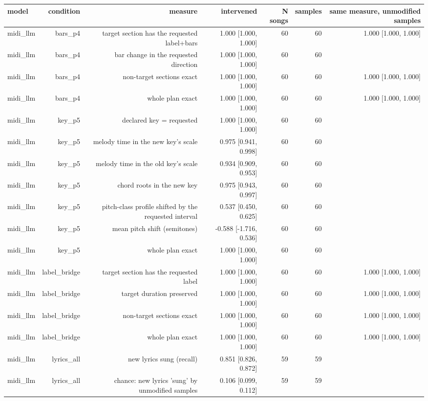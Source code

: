 \begin{table}[t]
\centering
\small
\begin{tabular}{lrrrrrr}
\toprule
model & condition & measure & intervened & N songs & samples & same measure, unmodified samples \\
\midrule
midi\_llm & bars\_p4 & target section has the requested label+bars & 1.000 [1.000, 1.000] & 60 & 60 & 1.000 [1.000, 1.000] \\
midi\_llm & bars\_p4 & bar change in the requested direction & 1.000 [1.000, 1.000] & 60 & 60 &  \\
midi\_llm & bars\_p4 & non-target sections exact & 1.000 [1.000, 1.000] & 60 & 60 & 1.000 [1.000, 1.000] \\
midi\_llm & bars\_p4 & whole plan exact & 1.000 [1.000, 1.000] & 60 & 60 & 1.000 [1.000, 1.000] \\
midi\_llm & key\_p5 & declared key = requested & 1.000 [1.000, 1.000] & 60 & 60 &  \\
midi\_llm & key\_p5 & melody time in the new key's scale & 0.975 [0.941, 0.998] & 60 & 60 &  \\
midi\_llm & key\_p5 & melody time in the old key's scale & 0.934 [0.909, 0.953] & 60 & 60 &  \\
midi\_llm & key\_p5 & chord roots in the new key & 0.975 [0.943, 0.997] & 60 & 60 &  \\
midi\_llm & key\_p5 & pitch-class profile shifted by the requested interval & 0.537 [0.450, 0.625] & 60 & 60 &  \\
midi\_llm & key\_p5 & mean pitch shift (semitones) & -0.588 [-1.716, 0.536] & 60 & 60 &  \\
midi\_llm & key\_p5 & whole plan exact & 1.000 [1.000, 1.000] & 60 & 60 &  \\
midi\_llm & label\_bridge & target section has the requested label & 1.000 [1.000, 1.000] & 60 & 60 & 1.000 [1.000, 1.000] \\
midi\_llm & label\_bridge & target duration preserved & 1.000 [1.000, 1.000] & 60 & 60 & 1.000 [1.000, 1.000] \\
midi\_llm & label\_bridge & non-target sections exact & 1.000 [1.000, 1.000] & 60 & 60 & 1.000 [1.000, 1.000] \\
midi\_llm & label\_bridge & whole plan exact & 1.000 [1.000, 1.000] & 60 & 60 & 1.000 [1.000, 1.000] \\
midi\_llm & lyrics\_all & new lyrics sung (recall) & 0.851 [0.826, 0.872] & 59 & 59 &  \\
midi\_llm & lyrics\_all & chance: new lyrics 'sung' by unmodified samples & 0.106 [0.099, 0.112] & 59 & 59 &  \\

\end{tabular}
\end{table}
